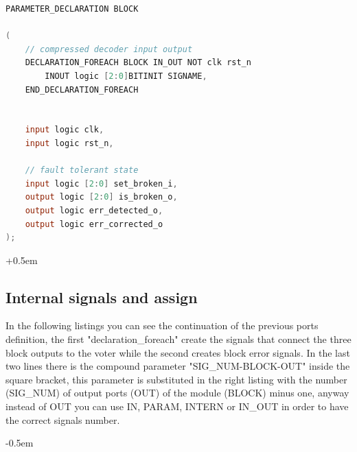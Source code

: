 {{{\begin{parcolumns}[colwidths={1=0.54\textwidth}, distance=0.5em]{2}
{\begin{lstlisting}[basicstyle=\ttfamily\scriptsize, language=Verilog, caption=Declaration Travulog Code, label=lst:declTV]
	PARAMETER_DECLARATION BLOCK

(
	// compressed decoder input output
	DECLARATION_FOREACH BLOCK IN_OUT NOT clk rst_n
		INOUT logic [2:0]BITINIT SIGNAME,
	END_DECLARATION_FOREACH

	
	input logic clk,
	input logic rst_n,  
	
	// fault tolerant state
	input logic [2:0] set_broken_i,
	output logic [2:0] is_broken_o,
	output logic err_detected_o,
	output logic err_corrected_o
);
    				\end{lstlisting}
    			}
    		\end{parcolumns}
    	
    		\openup +0.5em
    		
    		
    	}%
    	
    	\subsection{Internal signals and assign}{
    		In the following listings you can see the continuation of the previous ports definition, the first "declaration\_foreach" create the signals that connect the three block outputs to the voter while the second creates block error signals. In the last two lines there is the compound parameter "SIG\_NUM-BLOCK-OUT" inside the square bracket,  this parameter is substituted in the right listing with the number (SIG\_NUM) of output ports (OUT) of the module (BLOCK) minus one, anyway instead of OUT you can use IN, PARAM, INTERN or IN\_OUT in order to have the correct signals number.
    		
    		\openup -0.5em
    		
    		\begin{parcolumns}[colwidths={1=0.5\textwidth}, distance=0.5em]{2}
\end{parcolumns}}}}
